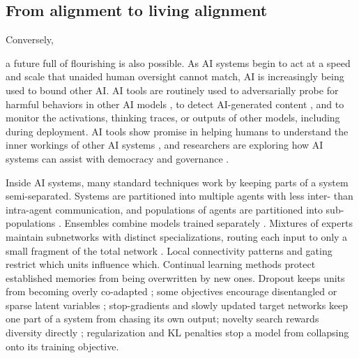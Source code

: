 \documentclass[11pt]{article}
\newif\ifmarkchanges
\newcommand{\rev}[2]{\leavevmode\linelabel{#1:a}\ifmarkchanges{\color{blue}#2}\else#2\fi\linelabel{#1:b}}
\newcommand{\del}[2][]{%
  \if\relax\detokenize{#1}\relax\else\leavevmode\linelabel{#1:a}\fi
  \ifmarkchanges{\color{red}\sout{#2}}\fi
  \if\relax\detokenize{#1}\relax\else\linelabel{#1:b}\fi}
\begin{document}







\subsection*{From alignment to living alignment}

Conversely, \del{the future could be very bright}\rev{flourishing}{a future full of flourishing is also possible}. As AI systems begin to act at a speed and scale that unaided human oversight cannot match, AI is increasingly being used to bound other AI. AI tools are routinely used to adversarially probe for harmful behaviors in other AI models \citep{perez2022red}, to detect AI-generated content \citep{rossler2019faceforensics}, and to monitor the activations, thinking traces, or outputs of other models, including during deployment. AI tools show promise in helping humans to understand the inner workings of other AI systems \citep{bills2023language}, and researchers are exploring how AI systems can assist with democracy and governance \citep{tessler2024ai, zheng2022ai}.

Inside AI systems, many standard techniques work by keeping parts of a system semi-separated. Systems are partitioned into multiple agents with less inter- than intra-agent communication, and populations of agents are partitioned into sub-populations \citep{hammond2025multi, holland1975adaptation, jaderberg2019human}. Ensembles combine models trained separately \citep{lakshminarayanan2017simple}. Mixtures of experts maintain subnetworks with distinct specializations, routing each input to only a small fragment of the total network \citep{shazeer2017outrageously}. Local connectivity patterns and gating restrict which units influence which. Continual learning methods protect established memories from being overwritten by new ones. Dropout keeps units from becoming overly co-adapted \citep{srivastava2014dropout}; some objectives encourage disentangled or sparse latent variables \citep{higgins2017betavae, cunningham2024sparse}; stop-gradients and slowly updated target networks keep one part of a system from chasing its own output; novelty search rewards diversity directly \citep{lehman2011abandoning}; regularization and KL penalties stop a model from collapsing onto its training objective.
\end{document}
